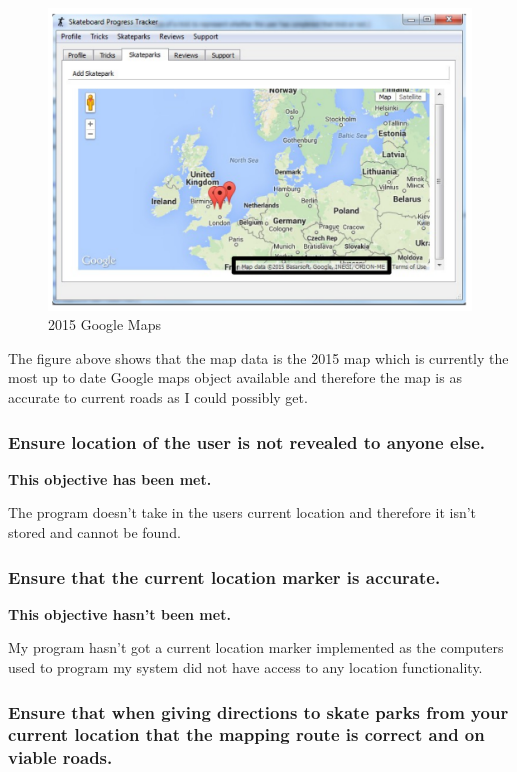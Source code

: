 \begin{figure}[H]
    \includegraphics[width=\textwidth]{./Evaluation/images/RecentMap.pdf}
    \caption{2015 Google Maps} \label{fig:RecentMap}
\end{figure}

The figure above shows that the map data is the 2015 map which is currently the most up to date Google maps object available and therefore the map is as accurate to current roads as I could possibly get.

\subsubsection {Ensure location of the user is not revealed to anyone else.}

\textbf{This objective has been met.}

The program doesn't take in the users current location and therefore it isn't stored and cannot be found.

\subsubsection {Ensure that the current location marker is accurate.}

\textbf{This objective hasn't been met.}

My program hasn't got a current location marker implemented as the computers used to program my system did not have access to any location functionality.

\subsubsection {Ensure that when giving directions to skate parks from your current location that the mapping route is correct and on viable roads. }

